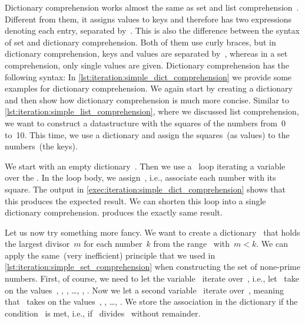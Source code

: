 %
\FloatBarrier%
\endhsection%
%
%
%
Dictionary comprehension works almost the same as set and list comprehension~\cite{PEP274}.
Different from them, it assigns values to keys and therefore has two expressions denoting each entry, separated by~\pythonilIdx{:}.
This is also the difference between the syntax of set and dictionary comprehension.
Both of them use curly braces, but in dictionary comprehension, keys and values are separated by~\pythonilIdx{:}, whereas in a set comprehension, only single values are given.
Dictionary comprehension has the following syntax:%
%
%
%
\FloatBarrier%
%
%
%
%
In \cref{lst:iteration:simple_dict_comprehension} we provide some examples for dictionary comprehension.
We again start by  creating a dictionary and then show how dictionary comprehension is much more concise.
Similar to \cref{lst:iteration:simple_list_comprehension}, where we discussed list comprehension, we want to construct a datastructure with the squares of the numbers from~0 to~10.
This time, we use a dictionary and assign the squares~(as values) to the numbers~(the keys).

We start with an empty dictionary~.
Then we use a ~loop iterating a variable~ over the .
In the loop body, we assign~, i.e., associate each number with its square.
The output in \cref{exec:iteration:simple_dict_comprehension} shows that this produces the expected result.
We can shorten this loop into a single dictionary comprehension.
 produces the exactly same result.

Let us now try something more fancy.
We want to create a dictionary~ that holds the largest divisor~$m$ for each number~$k$ from the range~ with~$m<k$.
We can apply the same~(very inefficient) principle that we used in \cref{lst:iteration:simple_set_comprehension} when constructing the set of none-prime numbers.
First, of course, we need to let the variable~ iterate over~, i.e., let~ take on the values~, , , \dots, , .
Now we let a second variable~ iterate over~, meaning that~ takes on the values~, , \dots, .
We store the association  in the dictionary if the condition~ is met, i.e., if~ divides~ without remainder.

